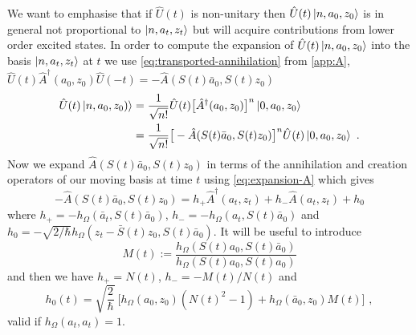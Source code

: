 \documentclass[12pt]{iopart} %
\begin{document}
We want to emphasise that if $\hat U(t)$ is non-unitary then $\hat U(t)\ket{n,a_0,z_0}$ is in general not proportional to $\ket{n,a_t,z_t}$ but will acquire contributions from lower order excited states. In order to compute the expansion of $\hat U(t)\ket{n,a_0,z_0}$ into the basis $\ket{n,a_t,z_t}$ at $t$ we use \eqref{eq:transported-annihilation} from \ref{app:A}, $\hat U(t)\hat A^{\dagger}(a_0,z_0)\hat U(-t)=-\hat A(S(t)\bar a_0,S(t)z_0)$
\begin{equation} \label{eq:HagProp}
\begin{split}
\hat U(t)\ket{n,a_0,z_0)}&=\frac{1}{\sqrt{n!}} \hat U(t)\big[\hat A^{\dagger}(a_0,z_0)\big]^n\ket{0,a_0,z_0}\\
&=\frac{1}{\sqrt{n!}} \big[-\hat A(S(t)\bar a_0,S(t)z_0)\big]^n \hat U(t)\ket{0,a_0,z_0}\,\, .
\end{split}
\end{equation}
Now we expand $\hat A(S(t)\bar a_0,S(t)z_0)$ in terms of the annihilation and creation operators of our moving basis at time $t$ using \eqref{eq:expansion-A} which gives
\begin{equation}\label{eq:expansion-A-t}
-\hat A(S(t)\bar a_0,S(t)z_0)=h_+ \hat A^{\dagger}(a_t,z_t)+h_-\hat A(a_t, z_t)+h_0
\end{equation}
where $h_+=-h_{\Omega}( \bar{a}_t,S(t)\bar{a}_0)$, $h_-=-h_{\Omega}(a_t,S(t) \bar{a}_0)$ and $h_0=-\sqrt{2/\hbar} h_{\Omega}(z_t- \bar{S}(t)z_0,S(t)\bar{a}_0)$. 
It will be useful to introduce 
\begin{equation}\label{eq:HagM}
    M(t):=\frac{h_{\Omega}(S(t)a_0,S(t)\bar{a}_0)}{h_{\Omega}(S(t)a_0,S(t)a_0)}
\end{equation}
and then we have $h_+=N(t)$,  $h_-=-M(t)/N(t)$ and  
\begin{equation}\label{eq:h0-m-N} %
    h_0(t)=\sqrt{\frac{2}{\hbar}}\ 
\big[h_{\Omega}(a_0,z_0)(N(t)^2-1)+h_{\Omega}(\bar a_0,z_0)M(t)\big]\,\, ,
\end{equation}
valid if $h_{\Omega}(a_t,a_t)=1$.
\end{document}
